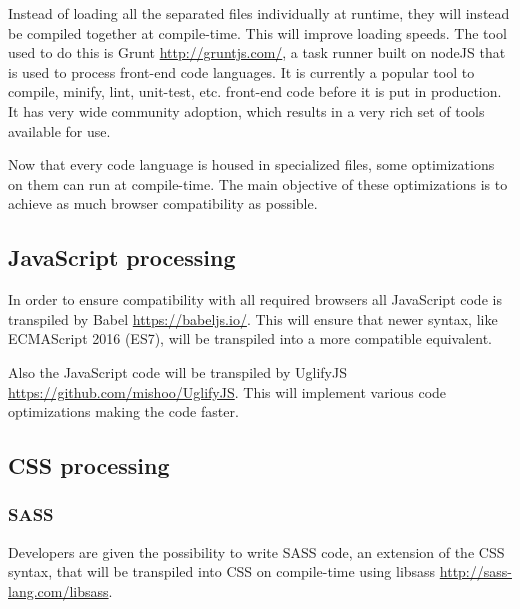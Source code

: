 Instead of loading all the separated files individually at runtime, they will
instead be compiled together at compile-time. This will improve loading speeds.
The tool used to do this is Grunt
\url{http://gruntjs.com/}, a task runner built on nodeJS that is used to process
front-end code languages. It is currently a popular tool to compile,
minify, lint, unit-test, etc. front-end code before it is put in production.
It has very wide community adoption, which results in a very rich set of tools
available for use.

Now that every code language is housed in specialized files, some
optimizations on them can run at compile-time. The main objective of these optimizations
is to achieve as much browser compatibility as possible.

\subsection{JavaScript processing}
In order to ensure compatibility with all required browsers all JavaScript code
is transpiled by Babel \url{https://babeljs.io/}. This will ensure that newer syntax,
like ECMAScript 2016 (ES7), will be transpiled into a more compatible equivalent.

Also the JavaScript code will be transpiled by UglifyJS
\url{https://github.com/mishoo/UglifyJS}. This will implement various code
optimizations\cite{UglifyJSCompressor} making the code faster.
\subsection{CSS processing}
\subsubsection{SASS}
Developers are given the possibility to write SASS code, an extension of the CSS
syntax, that will be transpiled into CSS on compile-time using libsass
\url{http://sass-lang.com/libsass}.


